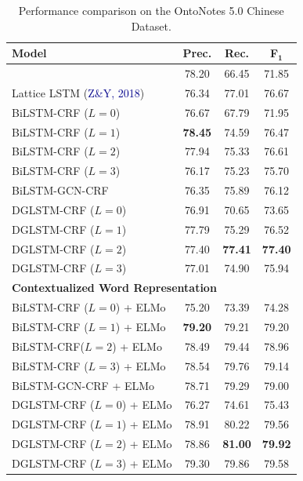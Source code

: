 \begin{table}[h!]
	\centering
		\begin{tabular}{lccc}
			\toprule
			\textbf{Model}& \textbf{Prec.} & \textbf{Rec.} & \textbf{F}$_\mathbf{1}$ \\
			\midrule
			\citet{pradhan2013towards}  &78.20 & 66.45 & 71.85\\ 
			Lattice LSTM (\textcolor{darkblue}{Z\&Y, 2018}) & 76.34& 77.01& 76.67 \\
			\cdashlinelr{1-4}
			BiLSTM-CRF ($L=0$) & 76.67& 67.79& 71.95  \\
			BiLSTM-CRF ($L=1$)  & \textbf{78.45} & 74.59 & 76.47 \\
			BiLSTM-CRF ($L=2$)  & 77.94 & 75.33 & 76.61 \\
			BiLSTM-CRF ($L=3$)  & 76.17 & 75.23 & 75.70 \\
			
			BiLSTM-GCN-CRF  & 76.35 & 75.89 & 76.12 \\
			\cdashlinelr{1-4}
			DGLSTM-CRF ($L=0$) & 76.91&70.65& 73.65 \\
			DGLSTM-CRF ($L=1$)   & 77.79 & 75.29 & 76.52 \\
			DGLSTM-CRF ($L=2$)   & 77.40 & \textbf{77.41} & \textbf{77.40} \\
			DGLSTM-CRF ($L=3$)&77.01  &74.90  &75.94 \\[1mm]
			\multicolumn{3}{l}{\textbf{Contextualized Word Representation}} &\\
			BiLSTM-CRF ($L=0$) + {\footnotesize ELMo} & 75.20 & 73.39 & 74.28 \\
			BiLSTM-CRF ($L=1$) + {\footnotesize ELMo}  & \textbf{79.20} & 79.21 & 79.20 \\
			BiLSTM-CRF($L=2$) + {\footnotesize ELMo}  & 78.49 & 79.44 & 78.96 \\
			BiLSTM-CRF ($L=3$) + {\footnotesize ELMo} &78.54  &79.76  &79.14 \\
			
			BiLSTM-GCN-CRF + {\footnotesize ELMo}   & 78.71 & 79.29 & 79.00 \\
			\cdashlinelr{1-4}
			DGLSTM-CRF ($L=0$) + {\footnotesize ELMo} & 76.27 & 74.61 &75.43 \\
			DGLSTM-CRF ($L=1$) + {\footnotesize ELMo}   &78.91&80.22& 79.56\\
			DGLSTM-CRF ($L=2$) + {\footnotesize ELMo}   & 78.86 & \textbf{81.00} & {\bf 79.92} \\
			DGLSTM-CRF ($L=3$) + {\footnotesize ELMo} & 79.30 &79.86  &79.58  \\
			\bottomrule
		\end{tabular}
	\caption{Performance comparison on the OntoNotes 5.0 Chinese Dataset.}
	\label{tab:mainresults_chinese}
\end{table}




